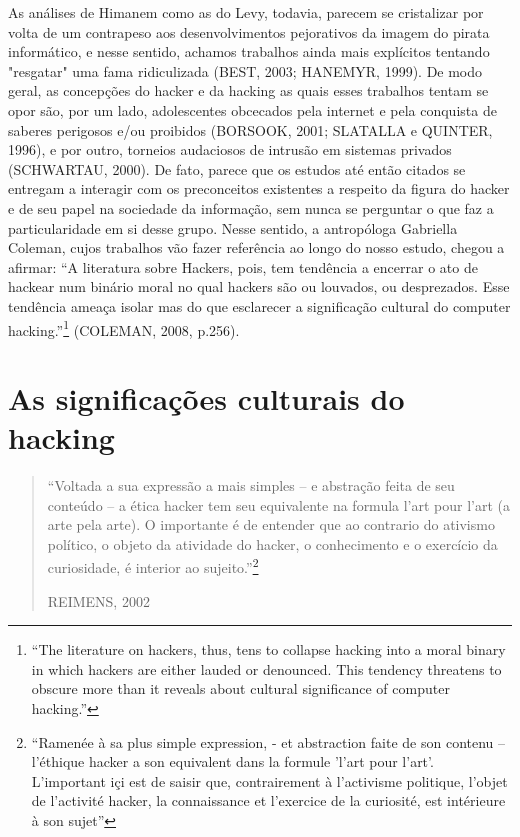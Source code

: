 As an\'alises de Himanem como as do Levy, todavia, parecem se cristalizar por volta de um contrapeso aos desenvolvimentos pejorativos da imagem do pirata informático, e nesse sentido, achamos trabalhos ainda mais explícitos tentando "resgatar" uma fama ridiculizada (BEST, 2003; HANEMYR, 1999). De modo geral, as concepções do hacker e da hacking as quais esses trabalhos tentam se opor são, por um lado, adolescentes obcecados pela internet e pela conquista de saberes perigosos e/ou proibidos (BORSOOK, 2001; SLATALLA e QUINTER, 1996), e por outro, torneios audaciosos de intrusão em sistemas privados (SCHWARTAU, 2000). De fato, parece que os estudos até então citados se entregam a interagir com os preconceitos existentes a respeito da figura do hacker e de seu papel na sociedade da informação, sem nunca se perguntar o que faz a particularidade em si desse grupo. Nesse sentido, a antropóloga Gabriella Coleman, cujos trabalhos vão fazer referência ao longo do nosso estudo, chegou a afirmar: “A literatura sobre Hackers, pois, tem tendência a encerrar o ato de hackear num binário moral no qual hackers são ou louvados, ou desprezados. Esse tendência ameaça isolar mas do que esclarecer a significação cultural do computer hacking.”\footnote{“The literature  on hackers, thus, tens to collapse hacking into a moral binary in which hackers are either lauded or denounced. This tendency threatens to obscure more than it reveals about cultural significance of computer hacking.”} (COLEMAN, 2008, p.256).

\section{As significações culturais do hacking} \label{2.2}

\begin{quote}
“Voltada a sua expressão a mais simples – e abstração feita de seu conteúdo – a ética hacker tem seu equivalente na formula l’art pour l’art (a arte pela arte). O importante é de entender que ao contrario do ativismo político, o objeto da atividade do hacker, o conhecimento e o exercício da curiosidade, é interior ao sujeito.”\footnote{“Ramenée à sa plus simple expression, - et abstraction faite de son contenu – l'éthique hacker a son equivalent dans la formule 'l'art pour l'art'. L'important içi est de saisir que, contrairement à l'activisme politique, l'objet de l'activité hacker, la connaissance et l'exercice de la curiosité, est intérieure à son sujet”}
\begin{flushright}
REIMENS, 2002
\end{flushright}
\end{quote}

